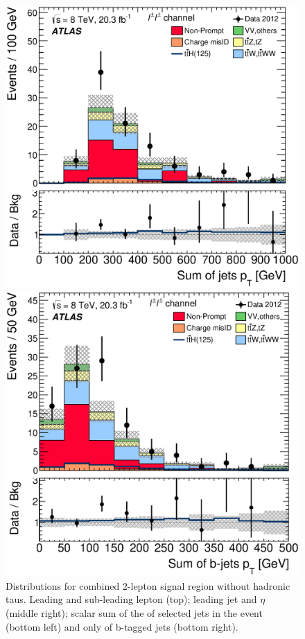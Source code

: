 \begin{figure}[!htbp]
\begin{minipage}[h]{0.4\textwidth}
  \end{minipage}\hfill
  \begin{minipage}[h]{0.4\textwidth}
    \centering \includegraphics[width=\textwidth]{figs/results/results_new/2lep_SR_SumPtJet}
  \end{minipage}\hfill
  \begin{minipage}[h]{0.4\textwidth}
    \centering \includegraphics[width=\textwidth]{figs/results/results_new/2lep_SR_SumPtBJet}
  \end{minipage}\hfill
  \caption{Distributions for combined 2-lepton signal region without hadronic taus.
    Leading and sub-leading lepton \pt (top); leading jet \pt and $\eta$ (middle right); 
    scalar sum of the \pt of selected jets in the event (bottom left) and only of b-tagged jets (bottom right).}
  \label{figure:results_2l_jet}
\end{figure} 

